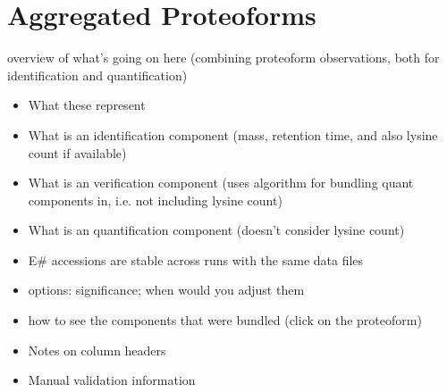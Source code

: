 
\section{Aggregated Proteoforms}
overview of what's going on here (combining proteoform observations, both for identification and quantification)

\begin{itemize}
	\item What these represent
	\item What is an identification component (mass, retention time, and also lysine count if available)
	\item What is an verification component (uses algorithm for bundling quant components in, i.e. not including lysine count)
	\item What is an quantification component (doesn't consider lysine count)
	\item E\# accessions are stable across runs with the same data files
	\item options: significance; when would you adjust them
	\item how to see the components that were bundled (click on the proteoform)
	\item Notes on column headers
	\item Manual validation information
\end{itemize}